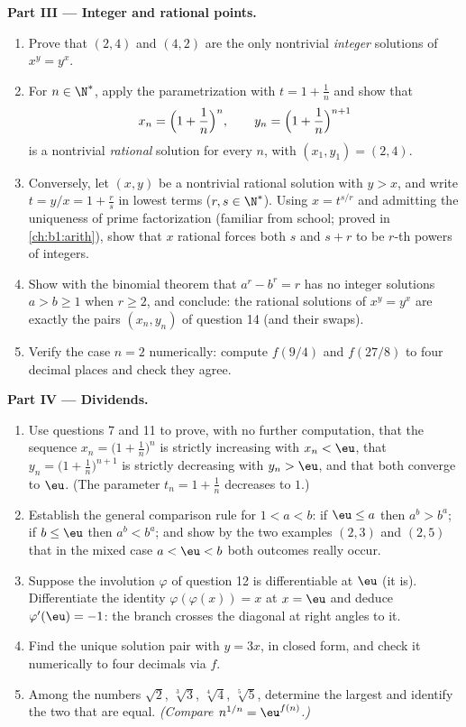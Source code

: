 \begin{problem}
\medskip
\noindent\textbf{Part III --- Integer and rational points.}
\begin{enumerate}[resume]
  \item Prove that $(2, 4)$ and $(4, 2)$ are the only nontrivial
        \emph{integer} solutions of $x^y = y^x$.
  \item For $n \in \N^*$, apply the parametrization with $t = 1 +
        \frac1n$ and show that
        \[
        x_n = \Bigl(1 + \frac1n\Bigr)^{n},
        \qquad
        y_n = \Bigl(1 + \frac1n\Bigr)^{n+1}
        \]
        is a nontrivial \emph{rational} solution for every $n$,
        with $(x_1, y_1) = (2, 4)$.
  \item Conversely, let $(x, y)$ be a nontrivial rational solution
        with $y > x$, and write $t = y/x = 1 + \frac rs$ in lowest
        terms ($r, s \in \N^*$). Using $x = t^{s/r}$ and admitting
        the uniqueness of prime factorization (familiar from
        school; proved in \cref{ch:b1:arith}), show that $x$
        rational forces both $s$ and $s + r$ to be $r$-th powers
        of integers.
  \item Show with the binomial theorem that $a^r - b^r = r$ has no
        integer solutions $a > b \geq 1$ when $r \geq 2$, and
        conclude: the rational solutions of $x^y = y^x$ are
        exactly the pairs $(x_n, y_n)$ of question 14 (and their
        swaps).
  \item Verify the case $n = 2$ numerically: compute $f(9/4)$ and
        $f(27/8)$ to four decimal places and check they agree.
\end{enumerate}

\medskip
\noindent\textbf{Part IV --- Dividends.}
\begin{enumerate}[resume]
  \item Use questions 7 and 11 to prove, with no further
        computation, that the sequence $x_n = \bigl(1 +
        \frac1n\bigr)^n$ is strictly increasing with $x_n < \eu$,
        that $y_n = \bigl(1 + \frac1n\bigr)^{n+1}$ is strictly
        decreasing with $y_n > \eu$, and that both converge to
        $\eu$. (The parameter $t_n = 1 + \frac1n$ decreases to
        $1$.)
  \item Establish the general comparison rule for $1 < a < b$:
        if $\eu \leq a$ then $a^b > b^a$; if $b \leq \eu$ then
        $a^b < b^a$; and show by the two examples $(2, 3)$ and
        $(2, 5)$ that in the mixed case $a < \eu < b$ both
        outcomes really occur.
  \item Suppose the involution $\varphi$ of question 12 is
        differentiable at $\eu$ (it is). Differentiate the
        identity $\varphi(\varphi(x)) = x$ at $x = \eu$ and deduce
        $\varphi'(\eu) = -1$: the branch crosses the diagonal at
        right angles to it.
  \item Find the unique solution pair with $y = 3x$, in closed
        form, and check it numerically to four decimals via $f$.
  \item Among the numbers $\sqrt2$, $\sqrt[3]3$, $\sqrt[4]4$,
        $\sqrt[5]5$, determine the largest and identify the two
        that are equal. \emph{(Compare $n^{1/n} =
        \eu^{f(n)}$.)}
\end{enumerate}


\end{problem}

